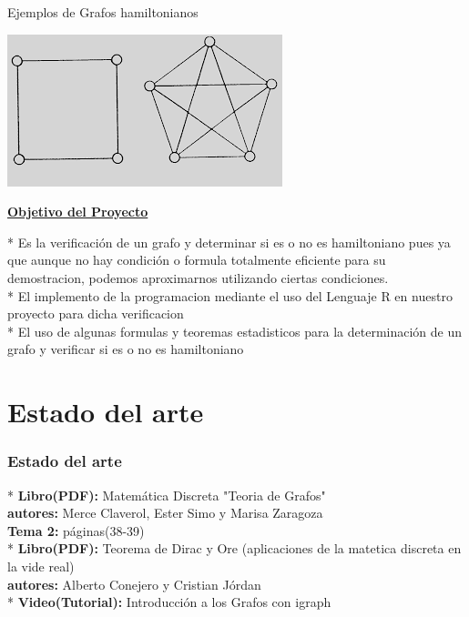 \documentclass{beamer}
\begin{document}
\begin{frame}
\begin{center}
Ejemplos de Grafos hamiltonianos
\end{center}
\begin{minipage}{4cm}
\includegraphics[scale=0.58]{grafo.PNG}
\end{minipage}
\begin{center}
\textbf{\underline{Objetivo del Proyecto}}
\end{center}
* Es la verificaci{\'o}n de un grafo y determinar si es o no es hamiltoniano  pues ya que aunque no hay condici{\'o}n o formula totalmente eficiente para su demostracion, podemos aproximarnos utilizando ciertas condiciones.\\
* El implemento de la programacion mediante el uso del Lenguaje R en nuestro proyecto para dicha verificacion\\
* El uso de algunas formulas y teoremas estadisticos para la determinaci{\'o}n de un grafo y verificar si es o no es hamiltoniano 
\end{frame}
\begin{frame}
\tableofcontents
\end{frame}
\section{Estado del arte}
\begin{frame}
\frametitle{Estado del arte}
* \textbf{Libro(PDF):} Matem{\'a}tica Discreta "Teoria de Grafos"\\
\textbf{autores:} Merce Claverol, Ester Simo y Marisa Zaragoza\\
\textbf{Tema 2:} p{\'a}ginas(38-39)\\
* \textbf{Libro(PDF):} Teorema de Dirac y Ore (aplicaciones de la matetica discreta en la vide real)\\
\textbf{autores:} Alberto Conejero y Cristian J{\'o}rdan\\
* \textbf{Video(Tutorial):} Introducci{\'o}n a los Grafos con igraph
\end{frame}
\end{document}
